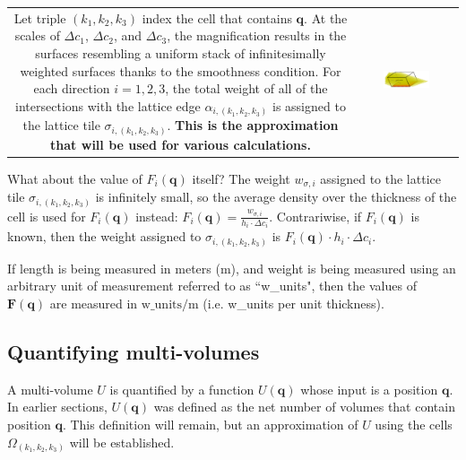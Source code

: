 \begin{tabular}{cc}
\parbox{0.5\textwidth}{
Let triple \((k_1, k_2, k_3)\) index the cell that contains \(\mathbf{q}\). At the scales of \(\Delta c_1\), \(\Delta c_2\), and \(\Delta c_3\), the magnification results in the surfaces resembling a uniform stack of infinitesimally weighted surfaces thanks to the smoothness condition. For each direction \(i = 1, 2, 3\), the total weight of all of the intersections with the lattice edge \(\alpha_{i, (k_1, k_2, k_3)}\) is assigned to the lattice tile \(\sigma_{i, (k_1, k_2, k_3)}\). {\bf This is the approximation that will be used for various calculations.} 
} & \parbox{0.5\textwidth}{
\includegraphics[width = 0.5\textwidth]{Coordinate_systems/surface_density}
}
\end{tabular}

\vspace{5mm}

What about the value of \(F_i(\mathbf{q})\) itself? The weight \(w_{\sigma,i}\) assigned to the lattice tile \(\sigma_{i, (k_1,k_2,k_3)}\) is infinitely small, so the average density over the thickness of the cell is used for \(F_i(\mathbf{q})\) instead: \(F_i(\mathbf{q}) = \frac{w_{\sigma,i}}{h_i \cdot \Delta c_i}\). Contrariwise, if \(F_i(\mathbf{q})\) is known, then the weight assigned to \(\sigma_{i, (k_1,k_2,k_3)}\) is \(F_i(\mathbf{q}) \cdot h_i \cdot \Delta c_i\).

If length is being measured in meters (m), and weight is being measured using an arbitrary unit of measurement referred to as ``w\_units", then the values of \(\mathbf{F}(\mathbf{q})\) are measured in \(\text{w\_units}/\text{m}\) (i.e. w\_units per unit thickness).





\subsection{Quantifying multi-volumes}

A multi-volume \(U\) is quantified by a function \(U(\mathbf{q})\) whose input is a position \(\mathbf{q}\). In earlier sections, \(U(\mathbf{q})\) was defined as the net number of volumes that contain position \(\mathbf{q}\). This definition will remain, but an approximation of \(U\) using the cells \(\Omega_{(k_1, k_2, k_3)}\) will be established. 

